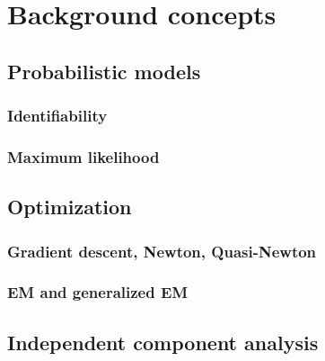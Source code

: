 \documentclass{report}
\begin{document}
\tableofcontents
\printunsrtglossary[type=symbols,style=long, title=Notations]



\chapter{Background concepts}
\section{Probabilistic models}
\subsection{Identifiability}
\subsection{Maximum likelihood}
\section{Optimization}
\subsection{Gradient descent, Newton, Quasi-Newton}
\subsection{EM and generalized EM}
\section{Independent component analysis}
\end{document}
